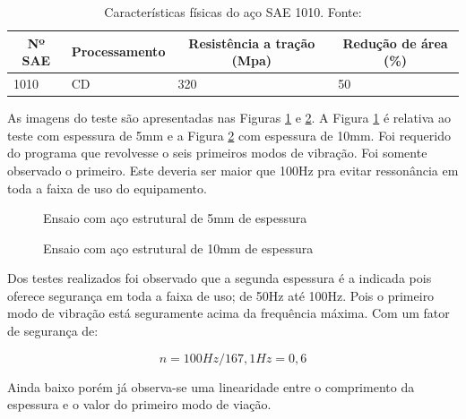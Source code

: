 \begin{table}[!h]
\centering
\caption{Características físicas do aço SAE 1010. Fonte: \cite{shigley}}
\label{tab:caracteristicas_aco}
\begin{tabular}{|l|l|l|l|}
\hline
\multicolumn{1}{|c|}{\textbf{Nº SAE}} & \multicolumn{1}{c|}{\textbf{Processamento}} & \multicolumn{1}{c|}{\textbf{Resistência a tração (Mpa)}} & \multicolumn{1}{c|}{\textbf{Redução de área (\%)}} \\ \hline
1010                                  & CD                                          & 320                                                      & 50                                                 \\ \hline
\end{tabular}
\end{table}

As imagens do teste são apresentadas nas Figuras \ref{fig:analise_1} e \ref{fig:analise_2}. A Figura \ref{fig:analise_1} é relativa ao teste com espessura de 5mm e a Figura \ref{fig:analise_2} com espessura de 10mm. Foi requerido do programa que revolvesse o seis primeiros modos de vibração. Foi somente observado o primeiro. Este deveria ser maior que 100Hz pra evitar ressonância em toda a faixa de uso do equipamento.

\begin{figure}[!ht]
\centering
\caption{Ensaio com aço estrutural de 5mm de espessura}
\label{fig:analise_1}
\end{figure}

\begin{figure}[!ht]
\centering
\caption{Ensaio com aço estrutural de 10mm de espessura}
\label{fig:analise_2}
\end{figure}

Dos testes realizados foi observado que a segunda espessura é a indicada pois oferece segurança em toda a faixa de uso; de 50Hz até 100Hz. Pois o primeiro modo de vibração está seguramente acima da frequência máxima. Com um fator de segurança de:

    \begin{equation}
            n = 100 Hz/167,1 Hz = 0,6 
    \end{equation}

Ainda baixo porém já observa-se uma linearidade entre o comprimento da espessura e o valor do primeiro modo de viação.
